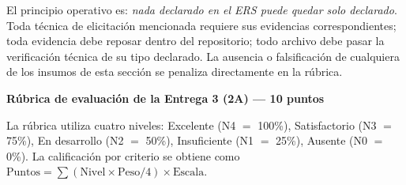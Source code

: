\documentclass[11pt,a4paper]{article}
\newcounter{secc}
\newcommand{\secband}[1]{%
    \stepcounter{secc}\par\vspace{9pt}\noindent
    {\setlength{\fboxsep}{0pt}%
        \colorbox{uteqgold}{\parbox[c][20pt][c]{0.05\textwidth}{\centering\textbf{\color{white}\small \arabic{secc}}}}%
        \colorbox{uteqgreen}{\parbox[c][20pt][c]{0.95\textwidth}{\hspace{8pt}\textbf{\color{white}\small #1}}}%
    }\par\vspace{5pt}}
\begin{document}
\begin{alertbox}[title=Regla operativa de la Sección 7 --- síntesis]
El principio operativo es: \emph{nada declarado en el ERS puede quedar solo declarado}. Toda técnica de elicitación mencionada requiere sus evidencias correspondientes; toda evidencia debe reposar dentro del repositorio; todo archivo debe pasar la verificación técnica de su tipo declarado. La ausencia o falsificación de cualquiera de los insumos de esta sección se penaliza directamente en la rúbrica.
\end{alertbox}

\secband{Rúbrica de evaluación de la Entrega 3 (2A) --- 10 puntos}

La rúbrica utiliza cuatro niveles: Excelente (N4 $=$ 100\%), Satisfactorio (N3 $=$ 75\%), En desarrollo (N2 $=$ 50\%), Insuficiente (N1 $=$ 25\%), Ausente (N0 $=$ 0\%).
La calificación por criterio se obtiene como $\text{Puntos} = \sum \left( \text{Nivel} \times \text{Peso} / 4 \right) \times \text{Escala}$.
\end{document}
